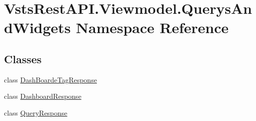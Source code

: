 \hypertarget{namespace_vsts_rest_a_p_i_1_1_viewmodel_1_1_querys_and_widgets}{}\section{Vsts\+Rest\+A\+P\+I.\+Viewmodel.\+Querys\+And\+Widgets Namespace Reference}
\label{namespace_vsts_rest_a_p_i_1_1_viewmodel_1_1_querys_and_widgets}
\subsection*{Classes}
\begin{DoxyCompactItemize}
\item 
class \mbox{\hyperlink{class_vsts_rest_a_p_i_1_1_viewmodel_1_1_querys_and_widgets_1_1_dash_boarde_tag_response}{Dash\+Boarde\+Tag\+Response}}
\item 
class \mbox{\hyperlink{class_vsts_rest_a_p_i_1_1_viewmodel_1_1_querys_and_widgets_1_1_dashboard_response}{Dashboard\+Response}}
\item 
class \mbox{\hyperlink{class_vsts_rest_a_p_i_1_1_viewmodel_1_1_querys_and_widgets_1_1_query_response}{Query\+Response}}
\end{DoxyCompactItemize}
